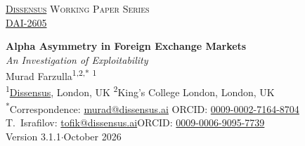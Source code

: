 \documentclass[11pt]{article}
\newcommand{\papernum}{DAI-2605}              %
\newcommand{\paperver}{3.1.1}
\newcommand{\paperdate}{October 2026}
\newcommand{\paperurl}{https://systems.ac/2/DAI-2605}
\begin{document}
\thispagestyle{firstpage}

\begin{center}
{\small\textsc{\href{https://dissensus.ai}{Dissensus} Working Paper Series}}\\[0.2em]
{\small \href{\paperurl}{\papernum}}
\end{center}

\vspace{1.5em}

\begin{center}
{\LARGE\bfseries Alpha Asymmetry in Foreign Exchange Markets}\\[0.5em]
{\large\itshape An Investigation of Exploitability}\\[1.5em]

{\large Murad Farzulla}\textsuperscript{1,2,*} \textsuperscript{1}\\[0.8em]

{\small
  \textsuperscript{1}\href{https://dissensus.ai}{Dissensus}, London, UK \quad
  \textsuperscript{2}King's College London, London, UK%
}\\[0.5em]

{\footnotesize
  \textsuperscript{*}Correspondence: \href{mailto:murad@dissensus.ai}{murad@dissensus.ai}
  \quad
  ORCID: \href{https://orcid.org/0009-0002-7164-8704}{0009-0002-7164-8704}\\
  T.\ Israfilov: \href{mailto:tofik@dissensus.ai}{tofik@dissensus.ai}\quad ORCID: \href{https://orcid.org/0009-0006-9095-7739}{0009-0006-9095-7739}%
}\\[0.3em]
{\footnotesize Version \paperver\quad$\cdot$\quad \paperdate}
\end{center}
\end{document}
